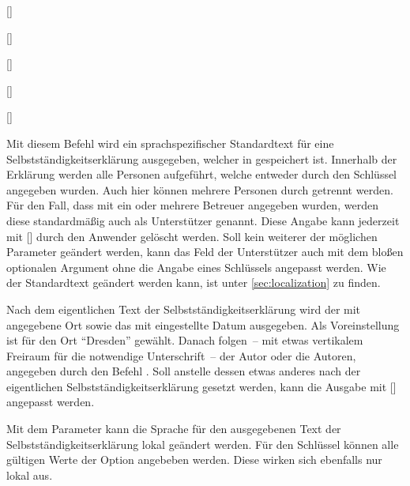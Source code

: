 \documentclass[%
  english,ngerman,%
  headings=optiontoheadandtoc,captions=tableheading,numbers=noenddot,%
  chapterpage,cdfoot,%
]{tudscrman}
\begin{document}
\begin{Declaration}{}
\begin{Declaration}{[]}
\begin{Declaration}{[]}
\begin{Declaration}{[]}
\begin{Declaration}{[]}
\begin{Declaration}{[\PSet]}
\printdeclarationlist%
%

Mit diesem Befehl wird ein sprachspezifischer Standardtext für eine 
Selbstständigkeitserklärung ausgegeben, welcher in  
gespeichert ist. Innerhalb der Erklärung werden alle Personen aufgeführt, welche 
entweder durch den Schlüssel  angegeben 
wurden. Auch hier können mehrere Personen durch  getrennt werden. Für 
den Fall, dass mit  ein oder mehrere Betreuer angegeben 
wurden, werden diese standardmäßig auch als Unterstützer genannt. Diese Angabe 
kann jederzeit mit [\PParameter{}] durch 
den Anwender gelöscht werden. Soll kein weiterer der möglichen Parameter 
geändert werden, kann das Feld der Unterstützer auch mit dem bloßen optionalen 
Argument ohne die Angabe eines Schlüssels angepasst werden. Wie der Standardtext 
geändert werden kann, ist unter \autoref{sec:localization} zu finden. 

Nach dem eigentlichen Text der Selbstständigkeitserklärung wird der mit 
 angegebene Ort sowie das mit  
eingestellte Datum ausgegeben. Als Voreinstellung ist für den Ort 
\enquote{Dresden} gewählt. Danach folgen~--  mit etwas vertikalem Freiraum für 
die notwendige Unterschrift~-- der Autor oder die Autoren, angegeben durch den 
Befehl . Soll anstelle dessen etwas anderes nach der eigentlichen 
Selbstständigkeitserklärung gesetzt werden, kann die Ausgabe mit
[] angepasst werden.

Mit dem Parameter  kann die Sprache für den 
ausgegebenen Text der Selbstständigkeitserklärung lokal geändert werden. Für den 
Schlüssel  können alle gültigen Werte der 
Option  angebeben werden. Diese wirken sich ebenfalls nur 
lokal aus.
\end{Declaration}
\end{Declaration}
\end{Declaration}
\end{Declaration}
\end{Declaration}
\end{Declaration}
\end{document}
